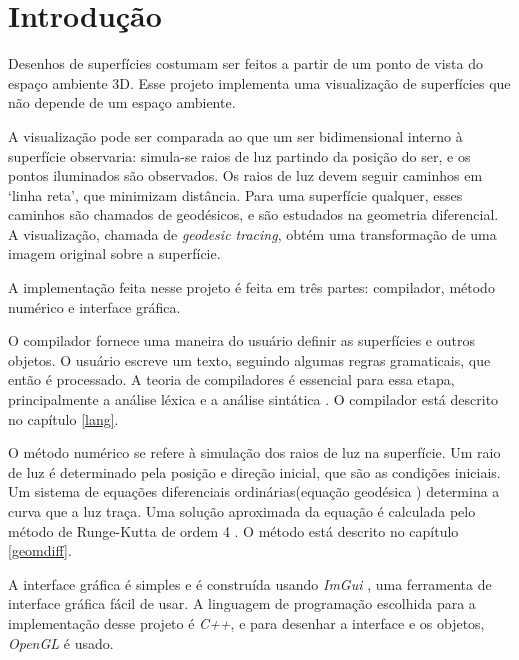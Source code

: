 \chapter{Introdução}
Desenhos de superfícies costumam ser feitos a partir de um ponto de vista do
espaço ambiente 3D.
Esse projeto implementa uma visualização de superfícies que não depende de um espaço ambiente.

A visualização pode ser comparada ao que um ser bidimensional interno à superfície observaria:
simula-se raios de luz partindo da posição do ser, e os pontos iluminados são observados.
Os raios de luz devem seguir caminhos em `linha reta', que minimizam distância.
Para uma superfície qualquer, esses caminhos são chamados de geodésicos,
e são estudados na geometria diferencial.
A visualização, chamada de \textit{geodesic tracing}, obtém uma transformação de uma imagem original sobre a superfície.

A implementação feita nesse projeto é feita em três partes:
compilador, método numérico e interface gráfica.

O compilador fornece uma maneira do usuário definir as superfícies e outros objetos.
O usuário escreve um texto, seguindo algumas regras gramaticais, que então é processado.
A teoria de compiladores é essencial para essa etapa,
principalmente a análise léxica e a análise sintática \cite{Dragon:1}.
O compilador está descrito no capítulo \ref{lang}.

O método numérico se refere à simulação dos raios de luz na superfície.
Um raio de luz é determinado pela posição e direção inicial, que são as condições iniciais.
Um sistema de equações diferenciais ordinárias(equação geodésica \cite{GeomDiff:1})
determina a curva que a luz traça.
Uma solução aproximada da equação é calculada pelo método de Runge-Kutta de ordem 4 \cite{Anal:1}.
O método está descrito no capítulo \ref{geomdiff}.

A interface gráfica é simples e é construída usando \textit{ImGui} \cite{ImGui},
uma ferramenta de interface gráfica fácil de usar.
A linguagem de programação escolhida para a implementação desse projeto é \textit{C++},
e para desenhar a interface e os objetos, \textit{OpenGL} é usado.